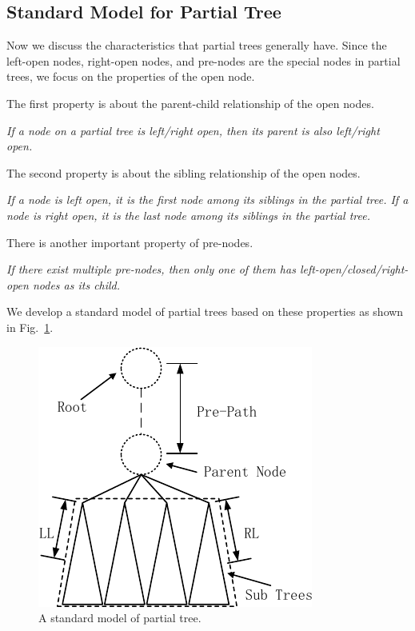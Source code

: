\subsection{Standard Model for Partial Tree}

Now we discuss the characteristics that partial trees generally
have. Since the left-open nodes, right-open nodes, and pre-nodes are the special nodes in
partial trees, we focus on the properties of the open node.

The first property is about the parent-child relationship of the open
nodes.

\begin{property}
\label{property1}\itshape
If a node on a partial tree is left/right open, then its parent is also left/right open.
\end{property}

The second property is about the sibling relationship of the open nodes. 

\begin{property}
\label{property2}\itshape
If a node is left open, it is the first node among its
siblings in the partial tree. If a node is right open, it is the last
node among its siblings in the partial tree.
\end{property}

There is another important property of pre-nodes.

\begin{property}
\label{property3}\itshape
If there exist multiple pre-nodes, then only one of
them has left-open/closed/right-open nodes as its child.
\end{property}

We develop a standard model of partial trees  based on these properties
as shown in Fig.~\ref{fig:model}.

\begin{figure}[t]
\centering\includegraphics{partialtree/figures/fromWord-4.pdf}
\caption{A standard model of partial tree.}
\label{fig:model}
\end{figure}
 
